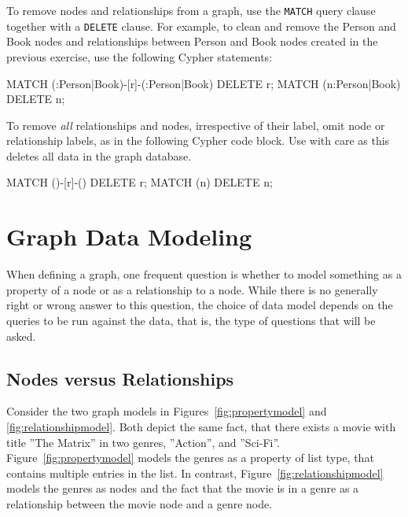 To remove nodes and relationships from a graph, use the \texttt{MATCH} query clause together with a \texttt{DELETE} clause. For example, to clean and remove the Person and Book nodes and relationships between Person and Book nodes created in the previous exercise, use the following Cypher statements:

\begin{cyphercode}
MATCH (:Person|Book)-[r]-(:Person|Book) DELETE r;
MATCH (n:Person|Book) DELETE n;
\end{cyphercode}

To remove \emph{all} relationships and nodes, irrespective of their label, omit node or relationship labels, as in the following Cypher code block. Use with care as this deletes all data in the graph database.

\begin{cyphercode}
MATCH ()-[r]-() DELETE r;
MATCH (n) DELETE n;
\end{cyphercode}

\section{Graph Data Modeling}

When defining a graph, one frequent question is whether to model something as a property of a node or as a relationship to a node. While there is no generally right or wrong answer to this question, the choice of data model depends on the queries to be run against the data, that is, the type of questions that will be asked.

\subsection*{Nodes versus Relationships}

Consider the two graph models in Figures~\ref{fig:propertymodel} and \ref{fig:relationshipmodel}. Both depict the same fact, that there exists a movie with title ''The Matrix'' in two genres, ''Action'', and ''Sci-Fi''. Figure~\ref{fig:propertymodel} models the genres as a property of list type, that contains multiple entries in the list. In contrast, Figure~\ref{fig:relationshipmodel} models the genres as nodes and the fact that the movie is in a genre as a relationship between the movie node and a genre node.

